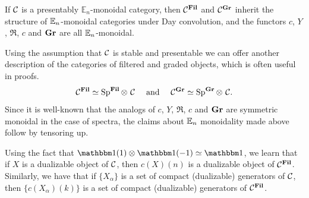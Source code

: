 \begin{dfn}
  If $\mathcal{C}$ is a presentably $\mathbb{E}_{n}$-monoidal category,
  then $\mathcal{C}^{\operatorname{\mathbf{Fil}}}$ and $\mathcal{C}^{\operatorname{\mathbf{Gr}}}$ inherit the structure of $\mathbb{E}_n$-monoidal categories under Day convolution,
  and the functors $c$, $Y$, $\Re$, $c$ and $\operatorname{\mathbf{Gr}}$ are all $\mathbb{E}_n$-monoidal.
\end{dfn}

\begin{rmk}
  Using the assumption that $\mathcal{C}$ is stable and presentable we can offer another description of the categories of filtered and graded objects, which is often useful in proofs.
  \[ \mathcal{C}^{\operatorname{\mathbf{Fil}}} \simeq \operatorname{\mathrm{Sp}}^{\operatorname{\mathbf{Fil}}} \otimes\ \mathcal{C} \quad \text{ and } \quad \mathcal{C}^{\operatorname{\mathbf{Gr}}} \simeq \operatorname{\mathrm{Sp}}^{\operatorname{\mathbf{Gr}}} \otimes\ \mathcal{C}. \]
  Since it is well-known that the analogs of $c$, $Y$, $\Re$, $c$ and $\operatorname{\mathbf{Gr}}$ are symmetric monoidal in the case of spectra, the claims about $\mathbb{E}_n$ monoidality made above follow by tensoring up. 
\end{rmk}

Using the fact that $\o(1) \otimes \o(-1) \simeq \o$, we learn that if $X$ is a dualizable object of $\mathcal{C}$, then $c(X)(n)$ is a dualizable object of $\mathcal{C}^{\operatorname{\mathbf{Fil}}}$. Similarly, we have that if $\{X_\alpha\}$ is a set of compact (dualizable) generators of $\mathcal{C}$, then $\{c(X_\alpha)(k)\}$ is a set of compact (dualizable) generators of $\mathcal{C}^{\operatorname{\mathbf{Fil}}}$.



